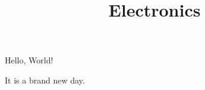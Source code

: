\documentclass[a4paper]{report}
\title{Electronics}
\begin{document}
    \maketitle
    \tableofcontents

    Hello, World!
    
    It is a brand new day. 
    
\end{document}
